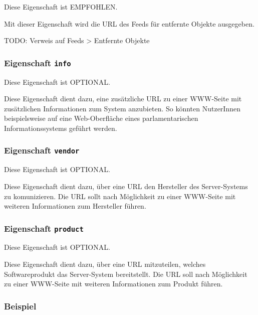 \documentclass[,a4paper]{article}
\begin{document}
Diese Eigenschaft ist EMPFOHLEN.

Mit dieser Eigenschaft wird die URL des Feeds für entfernte Objekte
ausgegeben.

TODO: Verweis auf Feeds \textgreater{} Entfernte Objekte

\subsubsection{Eigenschaft \texttt{info}}

Diese Eigenschaft ist OPTIONAL.

Diese Eigenschaft dient dazu, eine zusätzliche URL zu einer WWW-Seite
mit zusätzlichen Informationen zum System anzubieten. So könnten
NutzerInnen beispielsweise auf eine Web-Oberfläche eines
parlamentarischen Informationssystems geführt werden.

\subsubsection{Eigenschaft \texttt{vendor}}

Diese Eigenschaft ist OPTIONAL.

Diese Eigenschaft dient dazu, über eine URL den Hersteller des
Server-Systems zu komunizieren. Die URL sollt nach Möglichkeit zu einer
WWW-Seite mit weiteren Informationen zum Hersteller führen.

\subsubsection{Eigenschaft \texttt{product}}

Diese Eigenschaft ist OPTIONAL.

Diese Eigenschaft dient dazu, über eine URL mitzuteilen, welches
Softwareprodukt das Server-System bereitstellt. Die URL soll nach
Möglichkeit zu einer WWW-Seite mit weiteren Informationen zum Produkt
führen.

\subsubsection{Beispiel}
\end{document}

